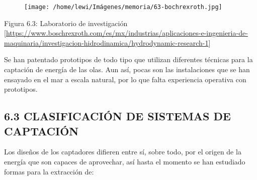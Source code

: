 \documentclass[]{article}
\begin{document}
\begin{figure}
\centering
\texttt{[image: /home/lewi/Imágenes/memoria/63-bochrexroth.jpg]}
\caption{}
\end{figure}

Figura 6.3: Laboratorio de investigación
{[}\url{https://www.boschrexroth.com/es/mx/industrias/aplicaciones-e-ingenieria-de-maquinaria/investigacion-hidrodinamica/hydrodynamic-research-1}{]}

Se han patentado prototipos de todo tipo que utilizan diferentes
técnicas para la captación de energía de las olas. Aun así, pocas son
las instalaciones que se han ensayado en el mar a escala natural, por lo
que falta experiencia operativa con prototipos.

\subsection{6.3 CLASIFICACIÓN DE SISTEMAS DE
CAPTACIÓN}\label{header-n44}

Los diseños de los captadores difieren entre sí, sobre todo, por el
origen de la energía que son capaces de aprovechar, así hasta el momento
se han estudiado formas para la extracción de:
\end{document}
